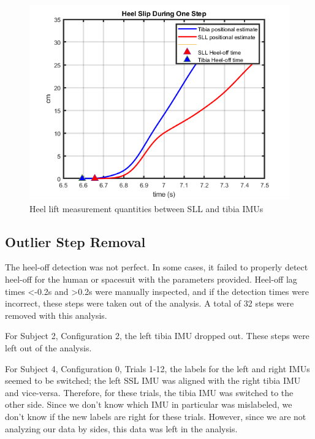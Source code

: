 \documentclass[defaultstyle,11pt]{comps}
\begin{document}
\begin{figure}
\hypertarget{fig:SA1-position}{%
\centering
\includegraphics{../fig/SA1/S3C0T1R_Meas.png}
\caption{Heel lift measurement quantities between SLL and tibia IMUs}\label{fig:SA1-position}
}
\end{figure}

\hypertarget{outlier-step-removal}{%
\subsection{Outlier Step Removal}\label{outlier-step-removal}}

The heel-off detection was not perfect.
In some cases, it failed to properly detect heel-off for the human or spacesuit with the parameters provided.
Heel-off lag times \textless-0.2s and \textgreater0.2s were manually inspected, and if the detection times were incorrect, these steps were taken out of the analysis. A total of 32 steps were removed with this analysis.

For Subject 2, Configuration 2, the left tibia IMU dropped out. These steps were left out of the analysis.

For Subject 4, Configuration 0, Trials 1-12, the labels for the left and right IMUs seemed to be switched; the left SSL IMU was aligned with the right tibia IMU and vice-versa. Therefore, for these trials, the tibia IMU was switched to the other side. Since we don't know which IMU in particular was mislabeled, we don't know if the new labels are right for these trials. However, since we are not analyzing our data by sides, this data was left in the analysis.
\end{document}
